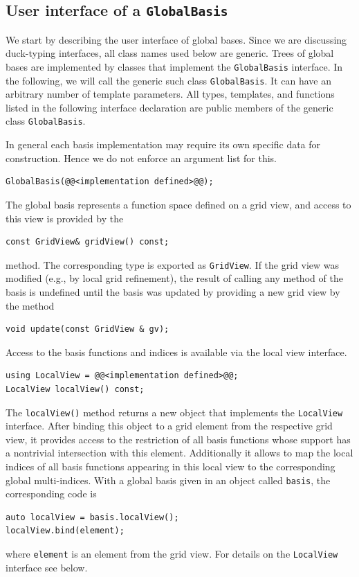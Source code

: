 \documentclass[a4paper,10pt,headings=normal,bibliography=totoc]{scrartcl}
\newcommand{\cpp}[1]{\lstinline[basicstyle=\ttfamily]!#1!}
\begin{document}
\subsection{User interface of a \texorpdfstring{\cpp{GlobalBasis}}{GlobalBasis}}
We start by describing the user interface of global bases.  Since we are discussing duck-typing interfaces,
all class names used below are generic. Trees of global bases are implemented by classes that implement
the \cpp{GlobalBasis} interface. In the following, we will call the generic such class \cpp{GlobalBasis}.
It can have an arbitrary number of template parameters.
All types, templates, and functions listed in the following
interface declaration are public members of
the generic class \cpp{GlobalBasis}.

In general each basis implementation may require its own specific data for construction.
Hence we do not enforce an argument list for this.
\begin{lstlisting}[style=Interface]
GlobalBasis(@@<implementation defined>@@);
\end{lstlisting}
The global basis represents a function space defined on a grid view, and access to
this view is provided by the
\begin{lstlisting}[style=Interface]
const GridView& gridView() const;
\end{lstlisting}
method. The corresponding type
is exported as \cpp{GridView}. If the grid view
was modified (e.g., by local grid refinement), the result of calling any
method of the basis is undefined until the basis was updated by
providing a new grid view by the method
\begin{lstlisting}[style=Interface]
void update(const GridView & gv);
\end{lstlisting}

Access to the basis functions and indices is available via the
local view interface.
\begin{lstlisting}[style=Interface]
using LocalView = @@<implementation defined>@@;
LocalView localView() const;
\end{lstlisting}
The \cpp{localView()} method returns a new object that implements the \cpp{LocalView} interface.
After binding this object to a
grid element from the respective grid view, it provides access
to the restriction of all basis functions whose support has a
nontrivial intersection with this element.
Additionally it allows to map the local indices
of all basis functions appearing in this local view to the
corresponding global multi-indices.
With a global basis given in an object called \cpp{basis},
the corresponding code is
\begin{lstlisting}[style=Example]
auto localView = basis.localView();
localView.bind(element);
\end{lstlisting}
where \cpp{element} is an element from the grid view.
For details on the
\cpp{LocalView} interface see below.
\end{document}

